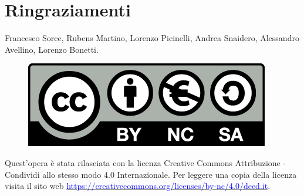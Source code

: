 \documentclass[11pt,headheight=35pt]{scrartcl}
\begin{document}
\section*{Ringraziamenti}
Francesco Sorce, Rubens Martino, Lorenzo Picinelli, Andrea Snaidero, Alessandro Avellino, Lorenzo Bonetti.

\vfill
\begin{figure}
	\href{https://creativecommons.org/licenses/by-nc/4.0/deed.it}{\includegraphics[scale=0.20]{immagini/licenza.png}}
\end{figure}
Quest'opera è stata rilasciata con la licenza Creative Commons Attribuzione - Condividi allo stesso modo 4.0 Internazionale.
Per leggere una copia della licenza visita il sito web \href{http://creativecommons.org/licenses/by-sa/4.0/deed.it}{\textcolor{blue}{https://creativecommons.org/licenses/by-nc/4.0/deed.it}}.

\newpage















\appendix

\end{document}

